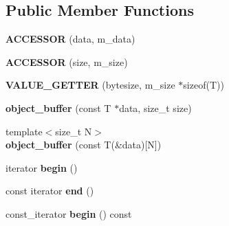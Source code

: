 \subsection*{Public Member Functions}
\begin{DoxyCompactItemize}
\item 
{\bfseries A\+C\+C\+E\+S\+S\+OR} (data, m\+\_\+data)\hypertarget{classgxx_1_1object__buffer_ac81aaee12e1e1d5c2640777ef07b9093}{}\label{classgxx_1_1object__buffer_ac81aaee12e1e1d5c2640777ef07b9093}

\item 
{\bfseries A\+C\+C\+E\+S\+S\+OR} (size, m\+\_\+size)\hypertarget{classgxx_1_1object__buffer_af552f00f5254628574384232a61af287}{}\label{classgxx_1_1object__buffer_af552f00f5254628574384232a61af287}

\item 
{\bfseries V\+A\+L\+U\+E\+\_\+\+G\+E\+T\+T\+ER} (bytesize, m\+\_\+size $\ast$sizeof(T))\hypertarget{classgxx_1_1object__buffer_affa9495a7da92c6ae827ce6003006997}{}\label{classgxx_1_1object__buffer_affa9495a7da92c6ae827ce6003006997}

\item 
{\bfseries object\+\_\+buffer} (const T $\ast$data, size\+\_\+t size)\hypertarget{classgxx_1_1object__buffer_a4af4988676fae4c1e31ab71c8c27782c}{}\label{classgxx_1_1object__buffer_a4af4988676fae4c1e31ab71c8c27782c}

\item 
{\footnotesize template$<$size\+\_\+t N$>$ }\\{\bfseries object\+\_\+buffer} (const T(\&data)\mbox{[}N\mbox{]})\hypertarget{classgxx_1_1object__buffer_aa38892f9585a3d86a8f3bfd8af8ae4a1}{}\label{classgxx_1_1object__buffer_aa38892f9585a3d86a8f3bfd8af8ae4a1}

\item 
iterator {\bfseries begin} ()\hypertarget{classgxx_1_1object__buffer_a90d0f5fb0fc10e40cb8b00d2f566d202}{}\label{classgxx_1_1object__buffer_a90d0f5fb0fc10e40cb8b00d2f566d202}

\item 
const iterator {\bfseries end} ()\hypertarget{classgxx_1_1object__buffer_aa0bb4b23b083b6529b3277a6d3fd960d}{}\label{classgxx_1_1object__buffer_aa0bb4b23b083b6529b3277a6d3fd960d}

\item 
const\+\_\+iterator {\bfseries begin} () const \hypertarget{classgxx_1_1object__buffer_af76361c653f35f63fd72dca1ea86dd59}{}\label{classgxx_1_1object__buffer_af76361c653f35f63fd72dca1ea86dd59}


\end{DoxyCompactItemize}
